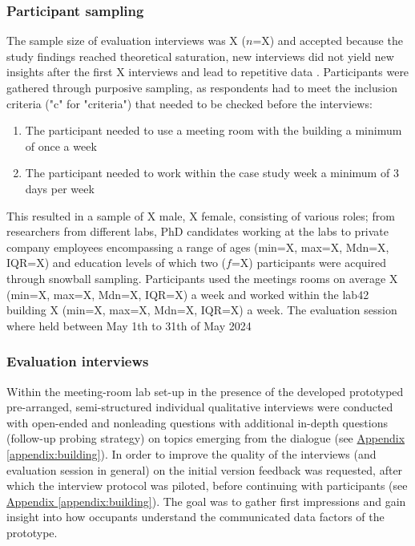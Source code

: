\subsubsection{Participant sampling}

The sample size of evaluation interviews was X ($n$=X) and accepted because the study findings reached theoretical saturation, new interviews did not yield new insights after the first X interviews and lead to repetitive data \cite{steph_menken_introduction_2016}. Participants were gathered through purposive sampling, as respondents had to meet the inclusion criteria ("c" for "criteria") that needed to be checked before the interviews: 

\begin{enumerate}
    \renewcommand{\labelenumi}{C\arabic{enumi}:}
    \item The participant needed to use a meeting room with the building a minimum of once a week
    \item The participant needed to work within the case study week a minimum of 3 days per week
\end{enumerate}

This resulted in a sample of X male, X female, consisting of various roles; from researchers from different labs, PhD candidates working at the labs to private company employees encompassing a range of ages (min=X, max=X, Mdn=X, IQR=X) and education levels of which two ($f$=X) participants were acquired through snowball sampling. Participants used the meetings rooms on average X (min=X, max=X, Mdn=X, IQR=X) a week and worked within the lab42 building X (min=X, max=X, Mdn=X, IQR=X) a week. The evaluation session where held between May 1th to 31th of May 2024

\subsubsection{Evaluation interviews}

Within the meeting-room lab set-up in the presence of the developed prototyped pre-arranged, semi-structured individual qualitative interviews were conducted with open-ended and nonleading questions with additional in-depth questions (follow-up probing strategy) on topics emerging from the dialogue (see \hyperref[appendix:building]{Appendix \ref*{appendix:building}}). In order to improve the quality of the interviews (and evaluation session in general) on the initial version feedback was requested, after which the interview protocol was piloted, before continuing with participants (see \hyperref[appendix:building]{Appendix \ref*{appendix:building}}). The goal was to gather first impressions and gain insight into how occupants understand the communicated data factors of the prototype.

